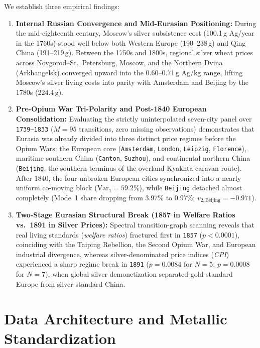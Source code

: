 \documentclass[11pt,a4paper]{article}
\begin{document}
We establish three empirical findings:
\begin{enumerate}
    \item \textbf{Internal Russian Convergence and Mid-Eurasian Positioning:} During the mid-eighteenth century, Moscow's silver subsistence cost (100.1\,g Ag/year in the 1760s) stood well below both Western Europe (190--238\,g) and Qing China (191--219\,g). Between the 1750s and 1800s, regional silver wheat prices across Novgorod--St.~Petersburg, Moscow, and the Northern Dvina (Arkhangelsk) converged upward into the 0.60--0.71\,g Ag/kg range, lifting Moscow's silver living costs into parity with Amsterdam and Beijing by the 1780s (224.4\,g).
    \item \textbf{Pre-Opium War Tri-Polarity and Post-1840 European Consolidation:} Evaluating the strictly uninterpolated seven-city panel over \texttt{1739--1833} ($M = 95$ transitions, zero missing observations) demonstrates that Eurasia was already divided into three distinct price regimes before the Opium Wars: the European core (\texttt{Amsterdam}, \texttt{London}, \texttt{Leipzig}, \texttt{Florence}), maritime southern China (\texttt{Canton}, \texttt{Suzhou}), and continental northern China (\texttt{Beijing}, the southern terminus of the overland Kyakhta caravan route). After 1840, the four unbroken European cities synchronized into a nearly uniform co-moving block ($\mathrm{Var}_1 = 59.2\%$), while \texttt{Beijing} detached almost completely (Mode~1 share dropping from 3.97\% to 0.97\%; $v_{2,\mathrm{Beijing}} = -0.971$).
    \item \textbf{Two-Stage Eurasian Structural Break (1857 in Welfare Ratios vs.\ 1891 in Silver Prices):} Spectral transition-graph scanning reveals that real living standards (\emph{welfare ratios}) fractured first in \texttt{1857} ($p < 0.0001$), coinciding with the Taiping Rebellion, the Second Opium War, and European industrial divergence, whereas silver-denominated price indices (\emph{CPI}) experienced a sharp regime break in \texttt{1891} ($p = 0.0084$ for $N=5$; $p = 0.0008$ for $N=7$), when global silver demonetization separated gold-standard Europe from silver-standard China.
\end{enumerate}

\section{Data Architecture and Metallic Standardization}
\end{document}

